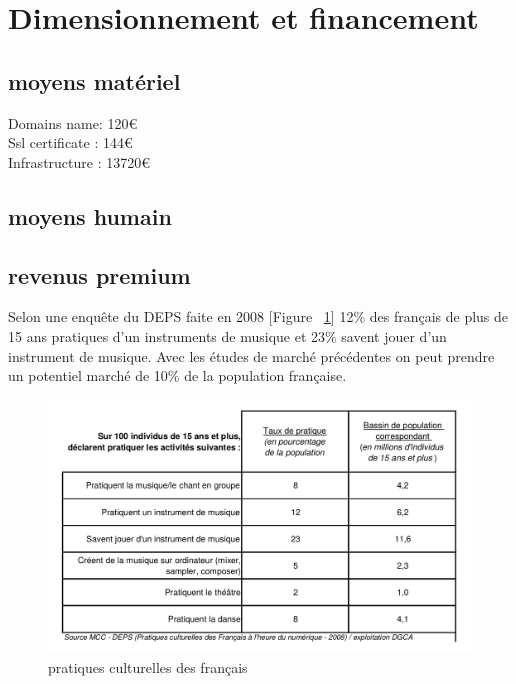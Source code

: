 \documentclass[a4,12pt]{article}
\begin{document}
\section{Dimensionnement et financement}


\subsection{moyens matériel}

Domains name: 120\euro\\
Ssl certificate : 144\euro\\
Infrastructure : 13720\euro\\

\subsection{moyens humain}

\subsection{revenus premium}

Selon une enquête du DEPS faite en 2008 [Figure ~\ref{fig:pratiques}]
12\% des français de plus de 15 ans pratiques d'un instruments de musique et 23\% savent
jouer d'un instrument de musique. Avec les études de marché précédentes on peut prendre un potentiel marché de 10\% de la population française.\\

\begin{figure}[!h]
    \centering
    \includegraphics[width=400pt]{pratiques_culturelles_des_francais.png}
    \caption{pratiques culturelles des français}
    \label{fig:pratiques}
\end{figure}
\end{document}
